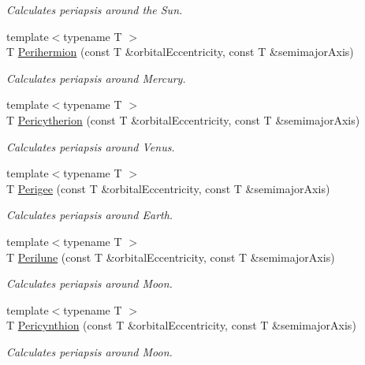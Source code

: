 \begin{DoxyCompactItemize}
\begin{DoxyCompactList}\small\item\em Calculates periapsis around the Sun. \end{DoxyCompactList}\item 
{\footnotesize template$<$typename T $>$ }\\T \hyperlink{group___periapsis_ga9562e9cbfd73019ae9cdaa643b843d63}{Perihermion} (const T \&orbital\+Eccentricity, const T \&semimajor\+Axis)
\begin{DoxyCompactList}\small\item\em Calculates periapsis around Mercury. \end{DoxyCompactList}\item 
{\footnotesize template$<$typename T $>$ }\\T \hyperlink{group___periapsis_gaa270e364cbbd7d3d6212872df484926f}{Pericytherion} (const T \&orbital\+Eccentricity, const T \&semimajor\+Axis)
\begin{DoxyCompactList}\small\item\em Calculates periapsis around Venus. \end{DoxyCompactList}\item 
{\footnotesize template$<$typename T $>$ }\\T \hyperlink{group___periapsis_gae2d053caf69cb0b4c3207064a2ab143a}{Perigee} (const T \&orbital\+Eccentricity, const T \&semimajor\+Axis)
\begin{DoxyCompactList}\small\item\em Calculates periapsis around Earth. \end{DoxyCompactList}\item 
{\footnotesize template$<$typename T $>$ }\\T \hyperlink{group___periapsis_ga2cc7ab05e18d32c94d8d74972e032793}{Perilune} (const T \&orbital\+Eccentricity, const T \&semimajor\+Axis)
\begin{DoxyCompactList}\small\item\em Calculates periapsis around Moon. \end{DoxyCompactList}\item 
{\footnotesize template$<$typename T $>$ }\\T \hyperlink{group___periapsis_gaeeba153b188cd06cbd233eaef12f0a6a}{Pericynthion} (const T \&orbital\+Eccentricity, const T \&semimajor\+Axis)
\begin{DoxyCompactList}\small\item\em Calculates periapsis around Moon. \end{DoxyCompactList}\item 

\end{DoxyCompactItemize}
